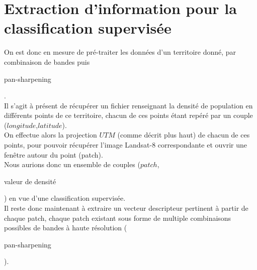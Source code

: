 \documentclass{book}
\begin{document}
\clearpage

\section{Extraction d'information pour la classification supervisée}

On est donc en mesure de pré-traiter les données d'un territoire donné, par combinaison de bandes puis \begin{itshape}pan-sharpening\end{itshape}.\\
Il s'agit à présent de récupérer un fichier renseignant la densité de population en différents points de ce territoire, chacun 
de ces points étant repéré par un couple ($longitude$,$latitude$).\\
On effectue alors la projection $UTM$ (comme décrit plus haut) de chacun de ces points, pour pouvoir récupérer l'image Landsat-8
correspondante et ouvrir une fenêtre autour du point (patch).\\
Nous aurions donc un ensemble de couples ($patch$,\begin{itshape}valeur de densité\end{itshape}) en vue d'une classification supervisée.\\
Il reste donc maintenant à extraire un vecteur descripteur pertinent à partir de chaque patch, chaque patch existant sous forme de multiple combinaisons
possibles de bandes à haute résolution (\begin{itshape}pan-sharpening\end{itshape}).

\backmatter

\listoftables

\listoffigures



\end{document}
